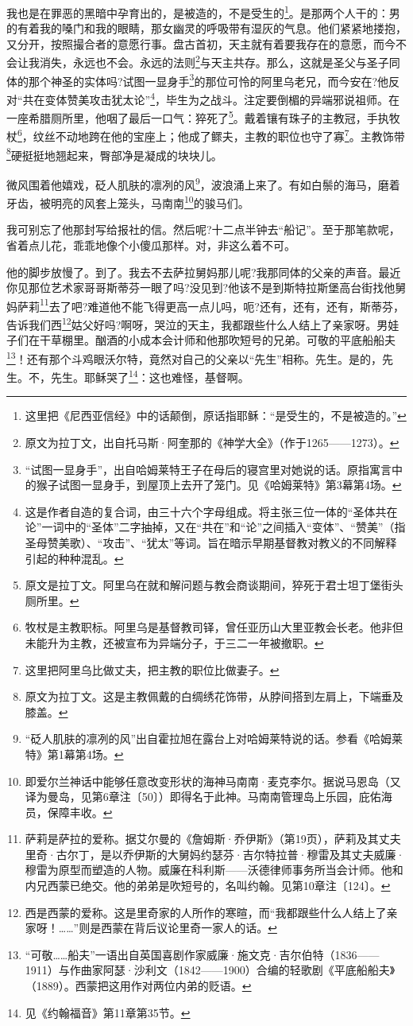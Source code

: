 \par 我也是在罪恶的黑暗中孕育出的，是被造的，不是受生的\footnote{这里把《尼西亚信经》中的话颠倒，原话指耶稣：“是受生的，不是被造的。”}。是那两个人干的：男的有着我的嗓门和我的眼睛，那女幽灵的呼吸带有湿灰的气息。他们紧紧地搂抱，又分开，按照撮合者的意愿行事。盘古首初，天主就有着要我存在的意愿，而今不会让我消失，永远也不会。永远的法则\footnote{原文为拉丁文，出自托马斯·阿奎那的《神学大全》（作于1265——1273）。}与天主共存。那么，这就是圣父与圣子同体的那个神圣的实体吗?试图一显身手\footnote{“试图一显身手”，出自哈姆莱特王子在母后的寝宫里对她说的话。原指寓言中的猴子试图一显身手，到屋顶上去开了笼门。见《哈姆莱特》第3幕第4场。}的那位可怜的阿里乌老兄，而今安在?他反对“共在变体赞美攻击犹太论”\footnote{这是作者自造的复合词，由三十六个字母组成。将主张三位一体的“圣体共在论”一词中的“圣体”二字抽掉，又在“共在”和“论”之间插入“变体”、“赞美”（指圣母赞美歌）、“攻击”、“犹太”等词。旨在暗示早期基督教对教义的不同解释引起的种种混乱。}，毕生为之战斗。注定要倒楣的异端邪说祖师。在一座希腊厕所里，他咽了最后一口气：猝死了\footnote{原文是拉丁文。阿里乌在就和解问题与教会商谈期间，猝死于君士坦丁堡街头厕所里。}。戴着镶有珠子的主教冠，手执牧杖\footnote{牧杖是主教职标。阿里乌是基督教司铎，曾任亚历山大里亚教会长老。他非但未能升为主教，还被宣布为异端分子，于三二一年被撤职。}，纹丝不动地跨在他的宝座上；他成了鳏夫，主教的职位也守了寡\footnote{这里把阿里乌比做丈夫，把主教的职位比做妻子。}。主教饰带\footnote{原文为拉丁文。这是主教佩戴的白绸绣花饰带，从脖间搭到左肩上，下端垂及膝盖。}硬挺挺地翘起来，臀部净是凝成的块块儿。
\par 微风围着他嬉戏，砭人肌肤的凛冽的风\footnote{“砭人肌肤的凛冽的风”出自霍拉旭在露台上对哈姆莱特说的话。参看《哈姆莱特》第1幕第4场。}，波浪涌上来了。有如白鬃的海马，磨着牙齿，被明亮的风套上笼头，马南南\footnote{即爱尔兰神话中能够任意改变形状的海神马南南·麦克李尔。据说马恩岛（又译为曼岛，见第6章注〔50〕）即得名于此神。马南南管理岛上乐园，庇佑海员，保障丰收。}的骏马们。
\par 我可别忘了他那封写给报社的信。然后呢?十二点半钟去“船记”。至于那笔款呢，省着点儿花，乖乖地像个小傻瓜那样。对，非这么着不可。
\par 他的脚步放慢了。到了。我去不去萨拉舅妈那儿呢?我那同体的父亲的声音。最近你见那位艺术家哥哥斯蒂芬一眼了吗?没见到?他该不是到斯特拉斯堡高台街找他舅妈萨莉\footnote{萨莉是萨拉的爱称。据艾尔曼的《詹姆斯·乔伊斯》（第19页），萨莉及其丈夫里奇·古尔丁，是以乔伊斯的大舅妈约瑟芬·吉尔特拉普·穆雷及其丈夫威廉·穆雷为原型而塑造的人物。威廉在科利斯——沃德律师事务所当会计师。他和内兄西蒙已绝交。他的弟弟是吹短号的，名叫约翰。见第10章注〔124〕。}去了吧?难道他不能飞得更高一点儿吗，呃?还有，还有，还有，斯蒂芬，告诉我们西\footnote{西是西蒙的爱称。这是里奇家的人所作的寒暄，而“我都跟些什么人结上了亲家呀！……”则是西蒙在背后议论里奇一家人的话。}姑父好吗?啊呀，哭泣的天主，我都跟些什么人结上了亲家呀。男娃子们在干草棚里。酗酒的小成本会计师和他那吹短号的兄弟。可敬的平底船船夫\footnote{“可敬……船夫”一语出自英国喜剧作家威廉·施文克·吉尔伯特（1836——1911）与作曲家阿瑟·沙利文（1842——1900）合编的轻歌剧《平底船船夫》（1889）。西蒙把这用作对两位内弟的贬语。}！还有那个斗鸡眼沃尔特，竟然对自己的父亲以“先生”相称。先生。是的，先生。不，先生。耶稣哭了\footnote{见《约翰福音》第11章第35节。}：这也难怪，基督啊。
